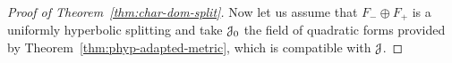 \documentclass[12pt,reqno]{amsart}
\numberwithin{equation}{section}
\theoremstyle{plain}
\theoremstyle{definition}
\newcommand{\RR}{{\mathbb R}}
\newcommand{\J}{\EuScript{J}}
\begin{document}
\begin{proof}[Proof of Theorem~\ref{thm:char-dom-split}]

Now let us assume that $F_-\oplus F_+$ is a uniformly
hyperbolic splitting and take $\J_0$ the field of quadratic
forms provided by Theorem~\ref{thm:phyp-adapted-metric},
which is compatible with $\J$.


\end{proof}
\end{document}
